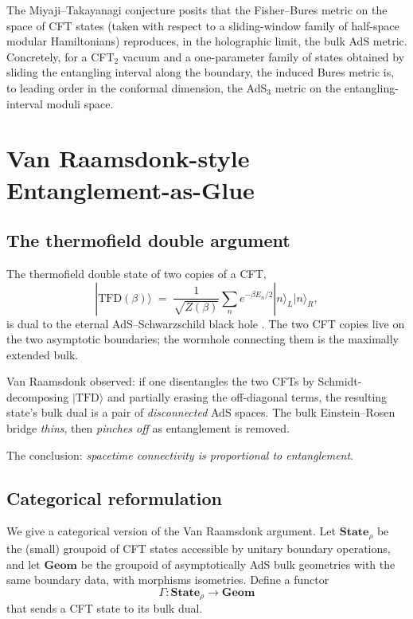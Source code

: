 \documentclass[12pt]{article}
\theoremstyle{definition}
\theoremstyle{remark}
\begin{document}
The Miyaji--Takayanagi conjecture \cite{miyaji2015} posits that the Fisher--Bures metric on the space of CFT states (taken with respect to a sliding-window family of half-space modular Hamiltonians) reproduces, in the holographic limit, the bulk AdS metric. Concretely, for a CFT$_2$ vacuum and a one-parameter family of states obtained by sliding the entangling interval along the boundary, the induced Bures metric is, to leading order in the conformal dimension, the AdS$_3$ metric on the entangling-interval moduli space.

\section{Van Raamsdonk-style Entanglement-as-Glue}
\label{sec:vanraamsdonk}

\subsection{The thermofield double argument}

The thermofield double state of two copies of a CFT,
\[
|\mathrm{TFD}(\beta)\rangle \;=\; \frac{1}{\sqrt{Z(\beta)}} \sum_n e^{-\beta E_n/2} |n\rangle_L |n\rangle_R,
\]
is dual to the eternal AdS--Schwarzschild black hole \cite{maldacena2003}. The two CFT copies live on the two asymptotic boundaries; the wormhole connecting them is the maximally extended bulk.

Van Raamsdonk \cite{vanraamsdonk2010} observed: if one disentangles the two CFTs by Schmidt-decomposing $|\mathrm{TFD}\rangle$ and partially erasing the off-diagonal terms, the resulting state's bulk dual is a pair of \emph{disconnected} AdS spaces. The bulk Einstein--Rosen bridge \emph{thins}, then \emph{pinches off} as entanglement is removed.

The conclusion: \emph{spacetime connectivity is proportional to entanglement}.

\subsection{Categorical reformulation}

We give a categorical version of the Van Raamsdonk argument. Let $\mathbf{State}_\rho$ be the (small) groupoid of CFT states accessible by unitary boundary operations, and let $\mathbf{Geom}$ be the groupoid of asymptotically AdS bulk geometries with the same boundary data, with morphisms isometries. Define a functor
\[
\Gamma\colon \mathbf{State}_\rho \to \mathbf{Geom}
\]
that sends a CFT state to its bulk dual.
\end{document}
